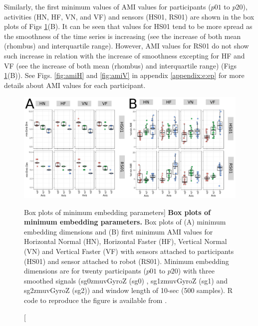 Similarly, the first minimum values of AMI values 
for participants ($p01$ to $p20$), activities (HN, HF, VN, and VF) and 
sensors (HS01, RS01) are shown in the box plots of 
Figs \ref{fig:CAOAMI-hhi}(B).
It can be seen that values for HS01 tend to be more spread as the smoothness 
of the time series is increasing 
(see the increase of both mean (rhombus) and interquartile range).
However, AMI values for RS01 do not show such increase in relation with
the increase of smoothness excepting for HF and VF
(see the increase of both mean (rhombus) and interquartile range) 
(Figs \ref{fig:CAOAMI-hhi}(B)).
See Figs. \ref{fig:amiH} and \ref{fig:amiV} in appendix \ref{appendix:e:ep} 
for more details about AMI values for each participant.
\begin{figure}
\centering
\includegraphics[width=1.0\textwidth]{CAOAMI}
	\caption
	[Box plots of minimum embedding parameters]{
	{\bf Box plots of minimum embedding parameters.} 
		Box plots of (A) minimum embedding dimensions 
		and (B) first minimum AMI values for 
		Horizontal Normal (HN), Horizontal Faster (HF),
		Vertical Normal (VN) and Vertical Faster (VF)
		with sensors attached to participants (HS01) and
		sensor attached to robot (RS01).
		Minimum embedding dimensions are for twenty participants 
		($p01$ to $p20$) with three smoothed signals 
		(sg0zmuvGyroZ (sg0) , sg1zmuvGyroZ (sg1) and sg2zmuvGyroZ (sg2))
		and window length of 10-sec (500 samples).
		R code to reproduce the figure is available 
		from \cite{hwum2018}.
        }
    \label{fig:CAOAMI-hhi}
\end{figure}




